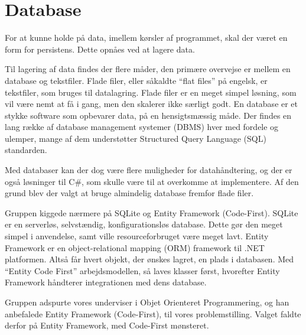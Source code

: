 \chapter{Database}
For at kunne holde på data, imellem kørsler af programmet, skal der været en form for persistens. 
Dette opnåes ved at lagere data. 

Til lagering af data findes der flere måder, den primære overvejse er mellem en database og tekstfiler.
Flade filer, eller såkaldte ``flat files'' på engelsk, er tekstfiler, som bruges til datalagring. 
Flade filer er en meget simpel løsning, som vil være nemt at få i gang, men den skalerer ikke særligt godt. 
En database er et stykke software som opbevarer data, på en hensigtsmæssig måde. 
Der findes en lang række af database management systemer (DBMS) hver med fordele og ulemper, mange af dem understøtter Structured Query Language (SQL) standarden.

Med databaser kan der dog være flere muligheder for datahåndtering, og der er også løsninger til C\#, som skulle være til at overkomme at implementere.\citep{flatfiles} 
Af den grund blev der valgt at bruge almindelig database fremfor flade filer. 

Gruppen kiggede nærmere på SQLite og Entity Framework (Code-First). 
SQLite er en serverløs, selvstændig, konfigurationsløs database. 
Dette gør den meget simpel i anvendelse, samt ville resourceforbruget være meget lavt. 
Entity Framework er en object-relational mapping (ORM) framework til .NET platformen. 
Altså får hvert objekt, der ønskes lagret, en plads i databasen. 
Med ``Entity Code First'' arbejdsmodellen, så laves klasser først, hvorefter Entity Framework håndterer integrationen med dens database.

Gruppen adspurte vores underviser i Objet Orienteret Programmering, og han anbefalede Entity Framework (Code-First), til vores problemstilling. 
Valget faldte derfor på Entity Framework, med Code-First mønsteret. 

